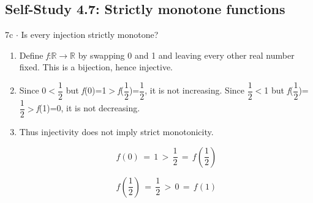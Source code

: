 \documentclass[11pt]{article}
\begin{document}
\begin{keepsection}\subsection{Self-Study 4.7: Strictly monotone functions}

\begin{workedbox}{7c \ensuremath{\cdot} Is every injection strictly monotone?}
\begin{enumerate}
\item Define \textit{f}:\ensuremath{\mathbb{R}}\ensuremath{\to}\ensuremath{\mathbb{R}} by swapping 0 and 1 and leaving every other real number fixed. This is a bijection, hence injective.
\item Since 0\ensuremath{<}{\small\ensuremath{\dfrac{1}{2}}} but \textit{f}(0)=1\ensuremath{>}\textit{f}({\small\ensuremath{\dfrac{1}{2}}})={\small\ensuremath{\dfrac{1}{2}}}, it is not increasing. Since {\small\ensuremath{\dfrac{1}{2}}}\ensuremath{<}1 but \textit{f}({\small\ensuremath{\dfrac{1}{2}}})={\small\ensuremath{\dfrac{1}{2}}}\ensuremath{>}\textit{f}(1)=0, it is not decreasing.
\item {}
Thus injectivity does not imply strict monotonicity.

\begin{equation*}{f}(0)\, =\, 1\, >\, \dfrac{1}{2}\, =\, {f}\left(\dfrac{1}{2}\right)\end{equation*}

\begin{equation*}{f}\left(\dfrac{1}{2}\right)\, =\, \dfrac{1}{2}\, >\, 0\, =\, {f}(1)\end{equation*}
\end{enumerate}
\end{workedbox}

\end{keepsection}
\end{document}
